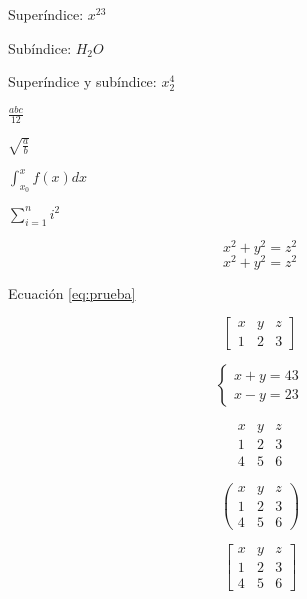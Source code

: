 \documentclass{article}
\begin{document}
Superíndice: $x^{23}$

Subíndice: $H_2O$

Superíndice y subíndice: $x^4_2$

$\frac{abc}{12}$

$\sqrt{\frac{a}{b}}$

$\int_{x_0}^{x}f(x)dx$

$\sum_{i=1}^{n}i^2$


\begin{equation}\label{eq:prueba}
  x^2 + y^2 = z^2
\end{equation}
\begin{equation*}
  x^2 + y^2 = z^2
\end{equation*}

Ecuación \ref{eq:prueba}

\begin{equation}
  \left[
  \begin{array}{ccc}
    x & y & z \\
    1 & 2 & 3
  \end{array}
  \right]
\end{equation}

\begin{equation}
  \left\{
    \begin{array}{l}
      x + y = 43 \\
      x - y = 23
    \end{array}
  \right.
\end{equation}

\begin{equation}
  \begin{matrix}
    x & y & z \\
    1 & 2 & 3\\
    4 & 5 & 6
  \end{matrix}
\end{equation}

\begin{equation}
  \begin{pmatrix}
    x & y & z \\
    1 & 2 & 3\\
    4 & 5 & 6
  \end{pmatrix}
\end{equation}

\begin{equation}
  \begin{bmatrix}
    x & y & z \\
    1 & 2 & 3\\
    4 & 5 & 6
  \end{bmatrix}
\end{equation}
\end{document}
